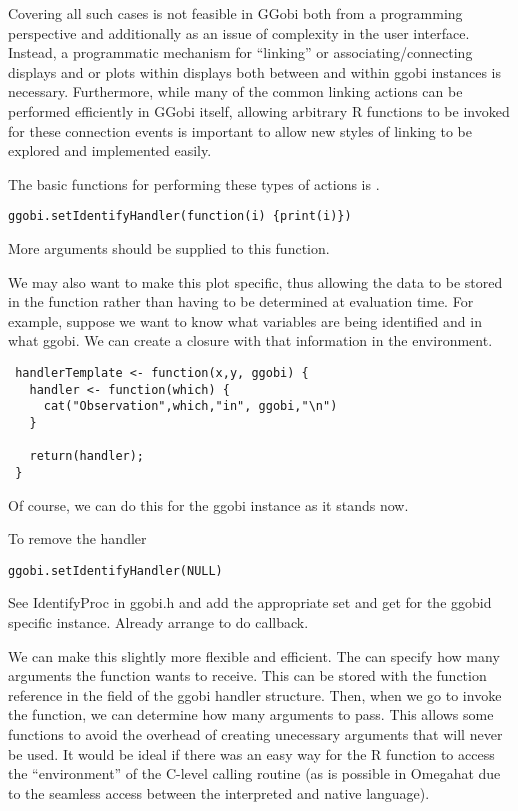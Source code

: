 \documentclass{article}
\begin{document}
Covering all such cases is not feasible in GGobi both from a
programming perspective and additionally as an issue of complexity in
the user interface.  Instead, a programmatic mechanism for ``linking''
or associating/connecting displays and or plots within displays both
between and within ggobi instances is necessary.  Furthermore, while
many of the common linking actions can be performed efficiently in
GGobi itself, allowing arbitrary R functions to be invoked for these
connection events is important to allow new styles of linking to be
explored and implemented easily.


The basic functions for performing these types of actions
is .
\begin{verbatim}
ggobi.setIdentifyHandler(function(i) {print(i)})
\end{verbatim}
More arguments should be supplied to this function. 

We may also want to make this plot specific, thus allowing the data to
be stored in the function rather than having to be determined at
evaluation time. For example, suppose we want to know what variables
are being identified and in what ggobi.  We can create a closure with
that information in the environment.
\begin{verbatim}
 handlerTemplate <- function(x,y, ggobi) {
   handler <- function(which) {
     cat("Observation",which,"in", ggobi,"\n")    
   }

   return(handler);
 }
\end{verbatim}
Of course, we can do this for the ggobi instance
as it stands now.


To remove the handler
\begin{verbatim}
ggobi.setIdentifyHandler(NULL)
\end{verbatim}

See IdentifyProc in ggobi.h and add the appropriate set and get for
the ggobid specific instance.  Already arrange to do callback.

We can make this slightly more flexible and efficient.  The
 can specify how many arguments
the function wants to receive.  This can be stored with the function
reference in the  field of the ggobi handler
structure. Then, when we go to invoke the function, we can determine
how many arguments to pass.  This allows some functions to avoid the
overhead of creating unecessary arguments that will never be used.  It
would be ideal if there was an easy way for the R function to access
the ``environment'' of the C-level calling routine (as is possible in
Omegahat due to the seamless access between the interpreted and native
language).
\end{document}

